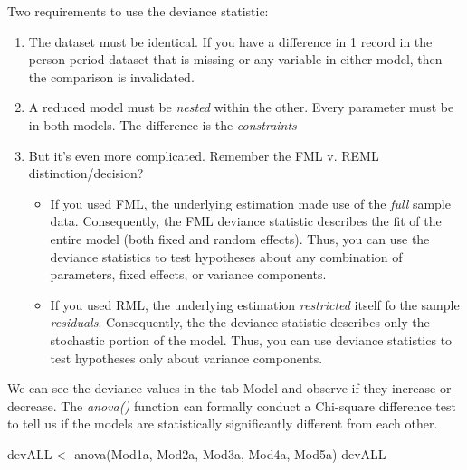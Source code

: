 \documentclass[
  english,
]{book}
\newenvironment{Shaded}{\begin{snugshade}}{\end{snugshade}}
\newcommand{\FunctionTok}[1]{\textcolor[rgb]{0.00,0.00,0.00}{#1}}
\newcommand{\NormalTok}[1]{#1}
\newcommand{\OtherTok}[1]{\textcolor[rgb]{0.56,0.35,0.01}{#1}}
\providecommand{\tightlist}{%
  \setlength{\itemsep}{0pt}\setlength{\parskip}{0pt}}
\begin{document}
Two requirements to use the deviance statistic:

\begin{enumerate}
\def\labelenumi{\arabic{enumi}.}
\tightlist
\item
  The dataset must be identical. If you have a difference in 1 record in the person-period dataset that is missing or any variable in either model, then the comparison is invalidated.
\item
  A reduced model must be \emph{nested} within the other. Every parameter must be in both models. The difference is the \emph{constraints}
\item
  But it's even more complicated. Remember the FML v. REML distinction/decision?

  \begin{itemize}
  \tightlist
  \item
    If you used FML, the underlying estimation made use of the \emph{full} sample data. Consequently, the FML deviance statistic describes the fit of the entire model (both fixed and random effects). Thus, you can use the deviance statistics to test hypotheses about any combination of parameters, fixed effects, or variance components.
  \item
    If you used RML, the underlying estimation \emph{restricted} itself fo the sample \emph{residuals}. Consequently, the the deviance statistic describes only the stochastic portion of the model. Thus, you can use deviance statistics to test hypotheses only about variance components.
  \end{itemize}
\end{enumerate}

We can see the deviance values in the tab-Model and observe if they increase or decrease. The \emph{anova()} function can formally conduct a Chi-square difference test to tell us if the models are statistically significantly different from each other.

\begin{Shaded}
\begin{Highlighting}[]
\NormalTok{devALL }\OtherTok{\textless{}{-}} \FunctionTok{anova}\NormalTok{(Mod1a, Mod2a, Mod3a, Mod4a, Mod5a) }
\NormalTok{devALL}
\end{Highlighting}
\end{Shaded}
\end{document}
